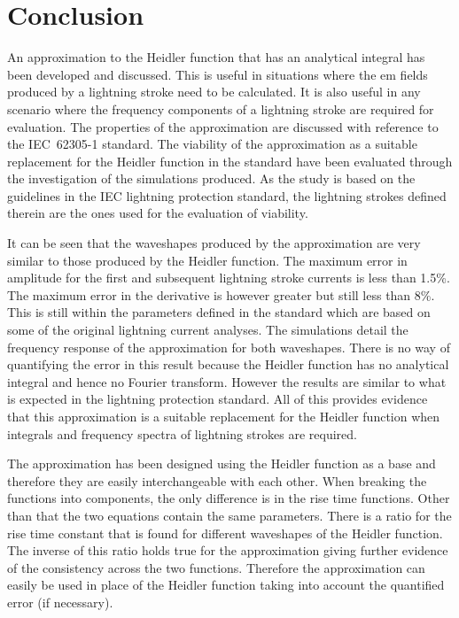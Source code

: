 
\chapter{Conclusion} %

\label{ChapterConclusion} %


An approximation to the Heidler function that has an analytical integral has been developed and discussed. This is useful in situations where the \gls{em} fields produced by a lightning stroke need to be calculated. It is also useful in any scenario where the frequency components of a lightning stroke are required for evaluation. The properties of the approximation are discussed with reference to the IEC~62305-1 standard. The viability of the approximation as a suitable replacement for the Heidler function in the standard have been evaluated through the investigation of the simulations produced. As the study is based on the guidelines in the IEC lightning protection standard, the lightning strokes defined therein are the ones used for the evaluation of viability.

It can be seen that the waveshapes produced by the approximation are very similar to those produced by the Heidler function. The maximum error in amplitude for the first and subsequent lightning stroke currents is less than 1.5\%. The maximum error in the derivative is however greater but still less than 8\%. This is still within the parameters defined in the standard which are based on some of the original lightning current analyses. The simulations detail the frequency response of the approximation for both waveshapes. There is no way of quantifying the error in this result because the Heidler function has no analytical integral and hence no Fourier transform. However the results are similar to what is expected in the lightning protection standard. All of this provides evidence that this approximation is a suitable replacement for the Heidler function when integrals and frequency spectra of lightning strokes are required.

The approximation has been designed using the Heidler function as a base and therefore they are easily interchangeable with each other. When breaking the functions into components, the only difference is in the rise time functions. Other than that the two equations contain the same parameters. There is a ratio for the rise time constant that is found for different waveshapes of the Heidler function. The inverse of this ratio holds true for the approximation giving further evidence of the consistency across the two functions. Therefore the approximation can easily be used in place of the Heidler function taking into account the quantified error (if necessary).

